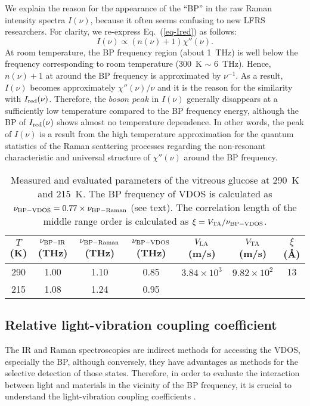 \documentclass[%
 reprint,
superscriptaddress,
 amsmath,amssymb,
 aps,
prb,
]{revtex4-1}
\begin{document}
We explain the reason for the appearance of the ``BP'' in the raw Raman intensity spectra $I(\nu)$, because it often seems confusing to new LFRS researchers.
For clarity, we re-express Eq.~(\ref{eq-Ired}) as follows:
\begin{equation}
I(\nu) \propto (n(\nu)+1)\chi''(\nu).
\label{eq-I}
\end{equation}
At room temperature, the BP frequency region (about 1~THz) is well below the frequency corresponding to room temperature (300~K $\sim$ 6~THz).
Hence, $n(\nu)+1$ at around the BP frequency is approximated by $\nu^{-1}$.
As a result, $I(\nu)$ becomes approximately $\chi''(\nu)/\nu$ and it is the reason for the similarity with $I_{\rm red}(\nu)$.
Therefore, the $boson$ $peak$ in $I(\nu)$ generally disappears at a sufficiently low temperature compared to the BP frequency energy, although the BP of $I_{\rm red}(\nu)$ shows almost no temperature dependence.
In other words, the peak of $I(\nu)$ is a result from the high temperature approximation for the quantum statistics of the Raman scattering processes regarding the non-resonant characteristic and universal structure of $\chi''(\nu)$ around the BP frequency.

\begin{table*}
\caption{\label{table1}Measured and evaluated parameters of the vitreous glucose at 290~K and 215~K. The BP frequency of VDOS is calculated as $\nu_{\rm BP-VDOS}=0.77 \times \nu_{\rm BP-Raman}$ (see text). The correlation length of the middle range order is calculated as $\xi = V_{\rm TA}/\nu_{\rm BP-VDOS}$.}
\begin{ruledtabular}
\begin{tabular}{ccccccc}
$T$ (K)&$\nu_{\rm BP-IR}$ (THz)&$\nu_{\rm BP-Raman}$ (THz)&$\nu_{\rm BP-VDOS}$ (THz)
&$V_{\rm LA}$ (m/s)&$V_{\rm TA}$ (m/s)&$\xi$ (\AA)\\ \hline
 290&1.00&1.10&0.85&$3.84 \times 10^{3}$&$9.82 \times 10^{2}$&13 \\
 215&1.08&1.24&0.95&\\
\end{tabular}
\end{ruledtabular}
\end{table*}

\subsection{Relative light-vibration coupling coefficient}

The IR and Raman spectroscopies are indirect methods for accessing the VDOS, especially the BP, although conversely, they have advantages as methods for the selective detection of those states. Therefore, in order to evaluate the interaction between light and materials in the vicinity of the BP frequency, it is crucial to understand the light-vibration coupling coefficients \cite{Shuker1970, Galeener1978, Surovtsev2002, Taraskin2006}.
\end{document}
